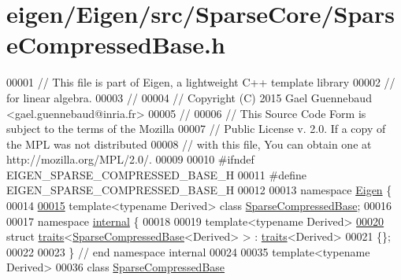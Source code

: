 \hypertarget{eigen_2_eigen_2src_2_sparse_core_2_sparse_compressed_base_8h_source}{}\section{eigen/\+Eigen/src/\+Sparse\+Core/\+Sparse\+Compressed\+Base.h}
\label{eigen_2_eigen_2src_2_sparse_core_2_sparse_compressed_base_8h_source}

\begin{DoxyCode}
00001 \textcolor{comment}{// This file is part of Eigen, a lightweight C++ template library}
00002 \textcolor{comment}{// for linear algebra.}
00003 \textcolor{comment}{//}
00004 \textcolor{comment}{// Copyright (C) 2015 Gael Guennebaud <gael.guennebaud@inria.fr>}
00005 \textcolor{comment}{//}
00006 \textcolor{comment}{// This Source Code Form is subject to the terms of the Mozilla}
00007 \textcolor{comment}{// Public License v. 2.0. If a copy of the MPL was not distributed}
00008 \textcolor{comment}{// with this file, You can obtain one at http://mozilla.org/MPL/2.0/.}
00009 
00010 \textcolor{preprocessor}{#ifndef EIGEN\_SPARSE\_COMPRESSED\_BASE\_H}
00011 \textcolor{preprocessor}{#define EIGEN\_SPARSE\_COMPRESSED\_BASE\_H}
00012 
00013 \textcolor{keyword}{namespace }\hyperlink{namespace_eigen}{Eigen} \{ 
00014 
\hyperlink{group___sparse_core___module}{00015} \textcolor{keyword}{template}<\textcolor{keyword}{typename} Derived> \textcolor{keyword}{class }\hyperlink{group___sparse_core___module_class_eigen_1_1_sparse_compressed_base}{SparseCompressedBase};
00016   
00017 \textcolor{keyword}{namespace }\hyperlink{namespaceinternal}{internal} \{
00018 
00019 \textcolor{keyword}{template}<\textcolor{keyword}{typename} Derived>
\hyperlink{struct_eigen_1_1internal_1_1traits_3_01_sparse_compressed_base_3_01_derived_01_4_01_4}{00020} \textcolor{keyword}{struct }\hyperlink{struct_eigen_1_1internal_1_1traits}{traits}<\hyperlink{group___sparse_core___module_class_eigen_1_1_sparse_compressed_base}{SparseCompressedBase}<Derived> > : \hyperlink{struct_eigen_1_1internal_1_1traits}{traits}<Derived>
00021 \{\};
00022 
00023 \} \textcolor{comment}{// end namespace internal}
00024 
00035 \textcolor{keyword}{template}<\textcolor{keyword}{typename} Derived>
00036 \textcolor{keyword}{class }\hyperlink{group___sparse_core___module_class_eigen_1_1_sparse_compressed_base}{SparseCompressedBase}

\end{DoxyCode}
